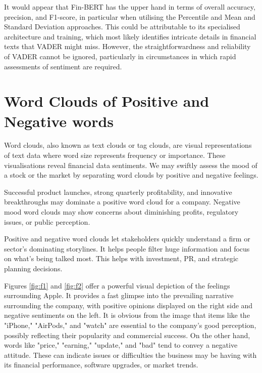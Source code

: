 \documentclass[12pt, a4paper,twoside]{report}
\theoremstyle{plain} %
\theoremstyle{definition} %
\theoremstyle{remark} %
\numberwithin{equation}{chapter}
\begin{document}
    It would appear that Fin-BERT has the upper hand in terms of overall accuracy, precision, and F1-score, in particular when utilising the Percentile and Mean and Standard Deviation approaches. This could be attributable to its specialised architecture and training, which most likely identifies intricate details in financial texts that VADER might miss. However, the straightforwardness and reliability of VADER cannot be ignored, particularly in circumstances in which rapid assessments of sentiment are required.

    \section{Word Clouds of Positive and Negative words}
    
    Word clouds, also known as text clouds or tag clouds, are visual representations of text data where word size represents frequency or importance. These visualisations reveal financial data sentiments. We may swiftly assess the mood of a stock or the market by separating word clouds by positive and negative feelings.

    Successful product launches, strong quarterly profitability, and innovative breakthroughs may dominate a positive word cloud for a company. Negative mood word clouds may show concerns about diminishing profits, regulatory issues, or public perception.
    
    Positive and negative word clouds let stakeholders quickly understand a firm or sector's dominating storylines. It helps people filter huge information and focus on what's being talked most. This helps with investment, PR, and strategic planning decisions.
    
   Figures \ref{fig:f1} and \ref{fig:f2} offer a powerful visual depiction of the feelings surrounding Apple. It provides a fast glimpse into the prevailing narrative surrounding the company, with positive opinions displayed on the right side and negative sentiments on the left. It is obvious from the image that items like the "iPhone," "AirPods," and "watch" are essential to the company's good perception, possibly reflecting their popularity and commercial success. On the other hand, words like "price," "earning," "update," and "bad" tend to convey a negative attitude. These can indicate issues or difficulties the business may be having with its financial performance, software upgrades, or market trends. 
   
\end{document}
